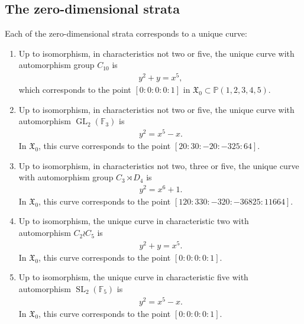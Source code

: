 \documentclass{amsart}
\newcommand{\GL}{\operatorname{GL}}
\newcommand{\SL}{\operatorname{SL}}
\numberwithin{equation}{section}
\theoremstyle{definition}
\theoremstyle{remark}
\begin{document}
\subsection{The zero-dimensional strata} \label{zerostrata_subsection}
Each of the zero-dimensional strata corresponds to a unique curve:
\begin{enumerate}
    \item Up to isomorphism, in characteristics not two or five, the unique curve with automorphism group $C_{10}$ is
    \begin{align*}
    y^2+y=x^5,
    \end{align*}
    which corresponds to the point $[0:0:0:0:1]$ in $\mathfrak{X}_0\subset\mathbb{P}(1,2,3,4,5)$. \\
    \item Up to isomorphism, in characteristics not two or five, the unique curve with automorphism $\GL_2(\mathbb{F}_3)$ is
    \begin{align*}
    y^2=x^5-x.
    \end{align*}
    In $\mathfrak{X}_0$, this curve corresponds to the point $[20: 30: -20: -325: 64]$.\\
    
    \item Up to isomorphism, in characteristics not two, three or five, the unique curve with automorphism group $C_3\rtimes D_4$ is
    \begin{align*}
    y^2=x^6+1.
    \end{align*}
     In $\mathfrak{X}_0$, this curve corresponds to the point $[120: 330: -320:-36825: 11664]$.\\
     
    \item Up to isomorphism, the unique curve in characteristic two with automorphism $C_2\wr C_5$ is
    \begin{align*}
    y^2+y=x^5.
    \end{align*}
 In $\mathfrak{X}_0$, this curve corresponds to the point $[0:0:0:0:1]$.\\
 
    \item Up to isomorphism, the unique curve in characteristic five with automorphism $\SL_2(\mathbb{F}_5)$ is
    \begin{align*}
    y^2=x^5-x.
    \end{align*}
    In $\mathfrak{X}_0$, this curve corresponds to the point $[0:0:0:0:1]$.\\
\end{enumerate}
\end{document}
